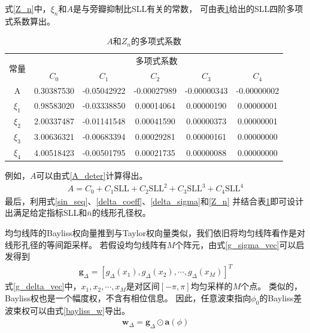 \documentclass[master]{thesis-uestc}
\begin{document}
式\eqref{Z_n}中，$\xi_n$和$A$是与旁瓣抑制比SLL有关的常数，
可由表\ref{Z_n_coeff_tab}给出的SLL四阶多项式系数算出。
\begin{table}[h]
    \begin{tabular}{|c|c|c|c|c|c|}
    \hline
    \multirow{2}{*}{常量}  & \multicolumn{5}{|c|}{多项式系数}  \\
    \cline{2-6}
    & $C_0$ & $C_1$ & $C_2$ & $C_3$ & $C_4$ \\
    \cline{1-6}
    A & 0.30387530 & -0.05042922 & -0.00027989 & -0.00000343 & -0.00000002 \\
    \cline{1-6}
    $\xi_1$ & 0.98583020 & -0.03338850 & 0.00014064 & 0.00000190 & 0.00000001 \\
    \cline{1-6}
    $\xi_2$ & 2.00337487 & -0.01141548 & 0.00041590 & 0.00000373 & 0.00000001 \\
    \cline{1-6}
    $\xi_3$ & 3.00636321 & -0.00683394 & 0.00029281 & 0.00000161 & 0.00000000 \\
    \cline{1-6}
    $\xi_4$ & 4.00518423 & -0.00501795 & 0.00021735 & 0.00000088 & 0.00000000 \\
    \hline
    \end{tabular}
    \caption{$A$和$Z_n$的多项式系数}
    \label{Z_n_coeff_tab}
\end{table}

例如，$A$可以由式\eqref{A_deter}计算得出。
\begin{equation}\label{A_deter}
    \begin{aligned}
        A = C_0 + C_1\text{SLL} + C_2\text{SLL}^2 + C_3\text{SLL}^3 + C_4\text{SLL}^4
    \end{aligned}
\end{equation}
最后，利用式\eqref{sin_seq}、\eqref{delta_coeff}、\eqref{delta_sigma}和\eqref{Z_n}
并结合表\ref{Z_n_coeff_tab}即可设计出满足给定指标SLL和$\bar{n}$的线形孔径权。

均匀线阵的Bayliss权向量推到与Taylor权向量类似，我们依旧将均匀线阵看作是对线形孔径的等间距采样。
若假设均匀线阵有$M$个阵元，由式\eqref{g_sigma_vec}可以启发得到
\begin{equation}\label{g_delta_vec}
    \begin{aligned}
        \bm{g}_{\Delta}=\left[g_{\Delta}\left(x_{1}\right), 
        g_{\Delta}\left(x_{2}\right), \cdots, g_{\Delta}\left(x_{M}\right)\right]^{T}
    \end{aligned}
\end{equation}
式\eqref{g_delta_vec}中，$x_1,x_2,\cdots,x_M$是对区间$\left[-\pi,\pi\right]$均匀采样的$M$个点。
类似的，Bayliss权也是一个幅度权，不含有相位信息。
因此，任意波束指向$\phi_0$的Bayliss差波束权可以由式\eqref{bayliss_w}导出。
\begin{equation}\label{bayliss_w}
    \begin{aligned}
        \bm{w}_\Delta = \bm{g}_\Delta \odot \bm{a}(\phi)
    \end{aligned}
\end{equation}
\end{document}
